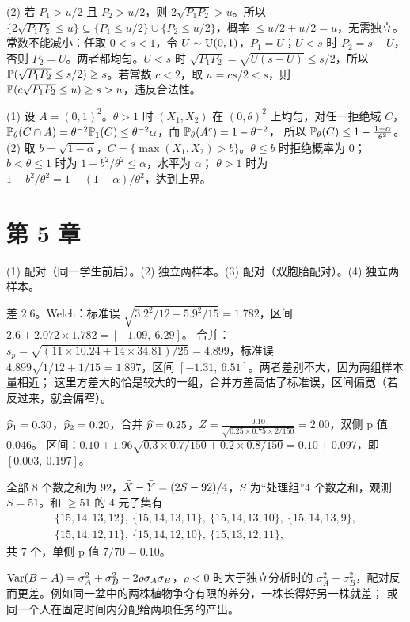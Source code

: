 (2) 若 $P_1>u/2$ 且 $P_2>u/2$，则 $2\sqrt{P_1P_2}>u$。所以 $\{2\sqrt{P_1P_2}\le u\}\subseteq\{P_1\le u/2\}\cup\{P_2\le u/2\}$，概率 $\le u/2+u/2=u$，无需独立。
常数不能减小：任取 $0<s<1$，令 $U\sim\Unif(0,1)$，$P_1=U$；$U<s$ 时 $P_2=s-U$，否则 $P_2=U$。两者都均匀。$U<s$ 时 $\sqrt{P_1P_2}=\sqrt{U(s-U)}\le s/2$，所以
$\P(\sqrt{P_1P_2}\le s/2)\ge s$。若常数 $c<2$，取 $u=cs/2<s$，则 $\P(c\sqrt{P_1P_2}\le u)\ge s>u$，违反合法性。

(1) 设 $A=(0,1)^2$。$\theta>1$ 时 $(X_1,X_2)$ 在 $(0,\theta)^2$ 上均匀，对任一拒绝域 $C$，$\P_\theta(C\cap A)=\theta^{-2}\P_1(C)\le\theta^{-2}\alpha$，而 $\P_\theta(A^c)=1-\theta^{-2}$，
所以 $\P_\theta(C)\le1-\frac{1-\alpha}{\theta^2}$。(2) 取 $b=\sqrt{1-\alpha}$，$C=\{\max(X_1,X_2)>b\}$。$\theta\le b$ 时拒绝概率为 $0$；$b<\theta\le1$ 时为 $1-b^2/\theta^2\le\alpha$，水平为 $\alpha$；
$\theta>1$ 时为 $1-b^2/\theta^2=1-(1-\alpha)/\theta^2$，达到上界。

\section*{第 5 章}

(1) 配对（同一学生前后）。(2) 独立两样本。(3) 配对（双胞胎配对）。(4) 独立两样本。

差 $2.6$。Welch：标准误 $\sqrt{3.2^2/12+5.9^2/15}=1.782$，区间 $2.6\pm2.072\times1.782=[-1.09,\ 6.29]$。
合并：$s_p=\sqrt{(11\times10.24+14\times34.81)/25}=4.899$，标准误 $4.899\sqrt{1/12+1/15}=1.897$，区间 $[-1.31,\ 6.51]$。两者差别不大，因为两组样本量相近；
这里方差大的恰是较大的一组，合并方差高估了标准误，区间偏宽（若反过来，就会偏窄）。

$\hatt p_1=0.30$，$\hatt p_2=0.20$，合并 $\hatt p=0.25$，$Z=\frac{0.10}{\sqrt{0.25\times0.75\times2/150}}=2.00$，双侧 p 值 $0.046$。
区间：$0.10\pm1.96\sqrt{0.3\times0.7/150+0.2\times0.8/150}=0.10\pm0.097$，即 $[0.003,\ 0.197]$。

全部 8 个数之和为 $92$，$\Xbar-\Ybar=(2S-92)/4$，$S$ 为“处理组”4 个数之和，观测 $S=51$。和 $\ge51$ 的 4 元子集有
\[
\begin{gathered}\{15,14,13,12\},\ \{15,14,13,11\},\ \{15,14,13,10\},\ \{15,14,13,9\},\\ \{15,14,12,11\},\ \{15,14,12,10\},\ \{15,13,12,11\},\end{gathered}
\]
共 $7$ 个，单侧 p 值 $7/70=0.10$。

$\Var(B-A)=\sigma_A^2+\sigma_B^2-2\rho\sigma_A\sigma_B$，$\rho<0$ 时大于独立分析时的 $\sigma_A^2+\sigma_B^2$，配对反而更差。例如同一盆中的两株植物争夺有限的养分，一株长得好另一株就差；
或同一个人在固定时间内分配给两项任务的产出。


